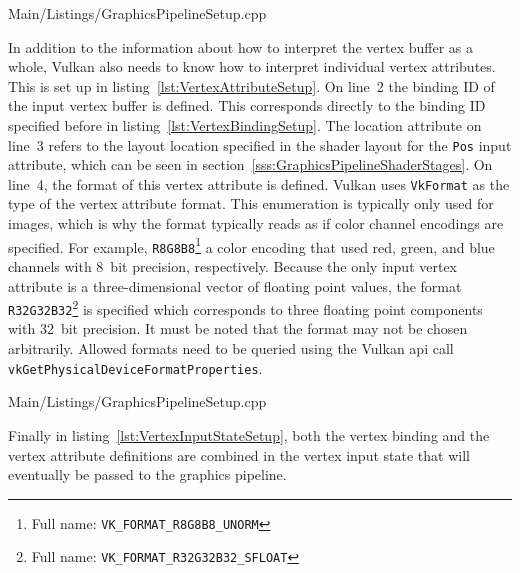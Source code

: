         
        {Main/Listings/GraphicsPipelineSetup.cpp}

        In addition to the information about how to interpret the vertex buffer as a whole, Vulkan also needs to know how to interpret individual vertex attributes.
        This is set up in listing~\ref{lst:VertexAttributeSetup}.
        On line~2 the binding ID of the input vertex buffer is defined.
        This corresponds directly to the binding ID specified before in listing~\ref{lst:VertexBindingSetup}.
        The location attribute on line~3 refers to the layout location specified in the shader layout for the \lstinline{Pos} input attribute, which can be seen in section~\ref{sss:GraphicsPipelineShaderStages}.
        On line~4, the format of this vertex attribute is defined.
        Vulkan uses \lstinline{VkFormat} as the type of the vertex attribute format.
        This enumeration is typically only used for images, which is why the format typically reads as if color channel encodings are specified.
        For example, \lstinline{R8G8B8}\footnote{Full name: \lstinline{VK_FORMAT_R8G8B8_UNORM}} a color encoding that used red, green, and blue channels with 8~bit precision, respectively.
        Because the only input vertex attribute is a three-dimensional vector of floating point values, the format \lstinline{R32G32B32}\footnote{Full name: \lstinline{VK_FORMAT_R32G32B32_SFLOAT}} is specified which corresponds to three floating point components with 32~bit precision.
        It must be noted that the format may not be chosen arbitrarily.
        Allowed formats need to be queried using the Vulkan \gls{api} call \lstinline{vkGetPhysicalDeviceFormatProperties}.

        
        {Main/Listings/GraphicsPipelineSetup.cpp}

        Finally in listing~\ref{lst:VertexInputStateSetup}, both the vertex binding and the vertex attribute definitions are combined in the vertex input state that will eventually be passed to the graphics pipeline.


